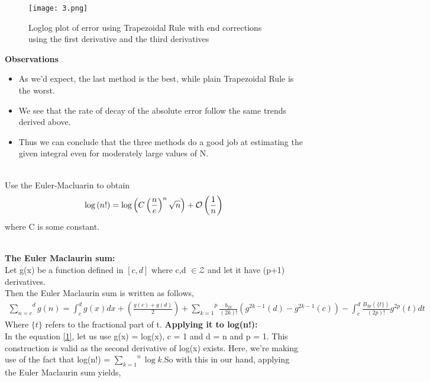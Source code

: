 \documentclass[letterpaper]{exam}
\begin{document}
\begin{questions}
\begin{solution}
\begin{figure}[H]
     \centering
    \texttt{[image: 3.png]}
     \label{fig:Dendrogram for the problem 3(c)}
     \caption{Loglog plot of error using Trapezoidal Rule with end corrections using the first derivative and the third derivatives}
\end{figure}
\newpage
\textbf{Observations}
\begin{itemize}
    \item As we'd expect, the last method is the best, while plain Trapezoidal Rule is the worst.
    \item We see that the rate of decay of the absolute error follow the same trends derived above.
    \item Thus we can conclude that the three methods do a good job at estimating the given integral even for moderately large values of N.
\end{itemize}
\end{solution}
\\
Use the Euler-Macluarin to obtain
\begin{align*}
    \text{log}\left(n!\right) = \text{log}\left(\huge{C}\left(\frac{n}{e}\right)^{n}\sqrt{n} \right) + \mathcal{O}\left(\frac{1}{n}\right)
\end{align*}
where C is some constant.
\begin{solution}
\\
\textbf{The Euler Maclaurin sum:}\\
Let g(x) be a function defined in $\left[c,d\right]$ where c,d $\in 
\mathcal{Z}$ and let it have (p+1) derivatives.\\
Then the Euler Maclaurin sum is written as follows,
\begin{align}\label{1}
\overset{d}{\underset{n=c}{\sum}} g(n) = \int_{c}^{d} g(x) dx + \left(\frac{g(c)+g(d)}{2}\right) + \overset{p}{\underset{k=1}{\sum}} \frac{b_{2k}}{(2k)!}\left(g^{2k-1}(d) - g^{2k-1}(c)\right) - \int_{c}^{d} \frac{B_{2p}(\{t\})}{(2p)!}g^{2p}(t) dt 
\end{align}
Where $\{t\}$ refers to the fractional part of t.
\textbf{Applying it to log(n!):}\\
In the equation \ref{1}, let us use g(x) = log(x), c = 1 and d = n and p = 1. This construction is valid as the second derivative of log(x) exists. Here, we're making use of the fact that log(n!) = $ \overset{n}{\underset{k=1}{\sum}} \log{k}$.So with this in our hand, applying the Euler Maclaurin sum yields,

\end{solution}
\end{questions}
\end{document}
